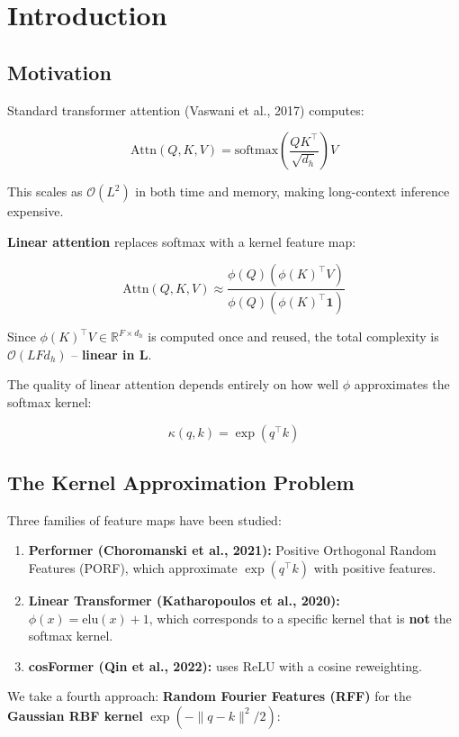 \section{Introduction}

\subsection{Motivation}

Standard transformer attention (Vaswani et al., 2017) computes:

\[
\text{Attn}(Q, K, V) = \text{softmax}\!\left(\frac{Q K^\top}{\sqrt{d_h}}\right) V
\tag{1.1}
\]

This scales as $\mathcal{O}(L^2)$ in both time and memory, making 
long-context inference expensive.

\textbf{Linear attention} replaces softmax with a kernel feature map:

\[
\text{Attn}(Q, K, V) \approx \frac{\phi(Q) \left(\phi(K)^\top V\right)}{\phi(Q) \left(\phi(K)^\top \mathbf{1}\right)}
\tag{1.2}
\]

Since $\phi(K)^\top V \in \mathbb{R}^{F \times d_h}$ is computed once and 
reused, the total complexity is $\mathcal{O}(L F d_h)$ -- \textbf{linear in L}.

The quality of linear attention depends entirely on how well $\phi$ 
approximates the softmax kernel:

\[
\kappa(q, k) = \exp(q^\top k)
\tag{1.3}
\]

\subsection{The Kernel Approximation Problem}

Three families of feature maps have been studied:

\begin{enumerate}
\item \textbf{Performer (Choromanski et al., 2021):} Positive Orthogonal Random
  Features (PORF), which approximate $\exp(q^\top k)$ with positive
  features.
\item \textbf{Linear Transformer (Katharopoulos et al., 2020):} $\phi(x) = \text{elu}(x) + 1$,
  which corresponds to a specific kernel that is \textbf{not} the softmax
  kernel.
\item \textbf{cosFormer (Qin et al., 2022):} uses $\text{ReLU}$ with a cosine
  reweighting.

\end{enumerate}
We take a fourth approach: \textbf{Random Fourier Features (RFF)} for the 
\textbf{Gaussian RBF kernel} $\exp(-\|q - k\|^2 / 2)$:

